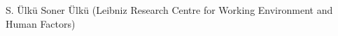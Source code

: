 
                {S.  Ülkü}
                {Soner Ülkü (Leibniz Research Centre for Working Environment and Human Factors)}
                